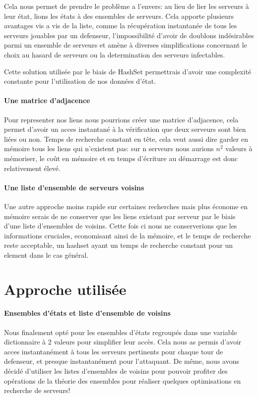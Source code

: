 \documentclass{scrreprt}
\begin{document}
    Cela nous permet de prendre le problème a l'envers: au lieu de lier les
    serveurs à leur état, lions les états à des ensembles de serveurs.
    Cela apporte plusieurs avantages vis a vis de la liste, comme la
    récupération instantanée de tous les serveurs jouables par un defenseur,
    l'impossibilité d'avoir de doublons indésirables parmi un ensemble de
    serveurs et amène à diverses simplifications concernant le choix au
    hasard de serveurs ou la determination des serveurs infectables.

    Cette solution utilisée par le biais de HashSet permettrais d'avoir une
    complexité constante pour l'utilisation de nos données d'état.



    \paragraph{Une matrice d'adjacence}
    Pour representer nos liens nous pourrions créer une matrice d'adjacence,
    cela permet d'avoir un acces instantané à la vérification que deux
    serveurs sont bien liées ou non.
    Temps de recherche constant en tête, cela veut aussi dire garder en
    mémoire tous les liens qui n'existent pas: sur n serveurs nous
    aurions $n^{2}$ valeurs à mémoriser, le coût en mémoire et en
    temps d'écriture au démarrage est donc relativement élevé.

    \paragraph{Une liste d'ensemble de serveurs voisins}
    Une autre approche moins rapide sur certaines recherches mais plus économe
    en mémoire serais de ne conserver que les liens existant par serveur par
    le biais d'une liste d'ensembles de voisins.
    Cette fois ci nous ne conserverions que les informations cruciales,
    economisant ainsi de la mémoire, et le temps de recherche reste
    acceptable, un hashset ayant un temps de recherche constant pour un
    element dans le cas général.


    \section{Approche utilisée}


    \paragraph{Ensembles d'états et liste d'ensemble de voisins}
    Nous finalement opté pour les ensembles d'états regroupés dans une
    variable dictionnaire à 2 valeurs pour simplifier leur accès.
    Cela nous as permis d'avoir acces instantanément à tous les serveurs
    pertinents pour chaque tour de defenseur, et presque instantanément pour
    l'attaquant.
    De même, nous avons décidé d'utiliser les listes d'ensembles de voisins
    pour pouvoir profiter des opérations de la théorie des ensembles pour
    réaliser quelques optimisations en recherche de serveurs!
\end{document}
